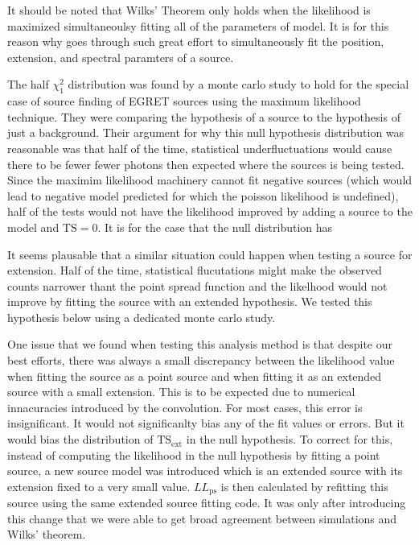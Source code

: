 \documentclass[preprint]{aastex}
\newcommand{\tsext}{{\ensuremath{\text{TS}_\text{ext}}}\xspace}
\newcommand{\ts}{\text{TS}\xspace}
\newcommand{\pointlike}{\text{\em pointlike}\xspace}
\begin{document}
It should be noted that Wilks' Theorem only holds when the likelihood
is maximized simultaneoulsy fitting all of the parameters of model. It
is for this reason why \pointlike goes through such great effort to
simultaneously fit the position, extension, and spectral paramters of
a source.

The half $\chi^2_1$ distribution was found by a monte carlo study
to hold for the special case of source finding of EGRET sources using the
maximum likelihood technique.  They were comparing the hypothesis of a
source to the hypothesis of just a background\cite{mattox_egret}.
Their argument for why this null hypothesis distribution was reasonable
was that half of the time, statistical underfluctuations would cause
there to be fewer fewer photons then expected where the sources is being
tested. Since the maximim likelihood machinery cannot fit negative
sources (which would lead to negative model predicted for which the
poisson likelihood is undefined), half of the tests would not have the
likelihood improved by adding a source to the model and $\ts=0$.
It is for the case that the null distribution has 

It seems plausable that a similar situation could happen when testing
a source for extension. Half of the time, statistical flucutations might
make the observed counts narrower thant the point spread function and
the likelhood would not improve by fitting the source with an extended
hypothesis. We tested this hypothesis below using a dedicated monte
carlo study.

One issue that we found when testing this analysis method is that
despite our best efforts, there was always a small discrepancy between
the likelihood value when fitting the source as a point source and when
fitting it as an extended source with a small extension.  This is to be
expected due to numerical innacuracies introduced by the convolution.
For most cases, this error is insignificant. It would not significanlty
bias any of the fit values or errors. But it would bias the distribution
of $\tsext$ in the null hypothesis. To correct for this,
instead of computing the likelihood in the null hypothesis by fitting
a point source, a new source model was introduced which is an extended
source with its extension fixed to a very small value. $LL_\text{ps}$
is then calculated by refitting this source using the same extended
source fitting code. It was only after introducing this change that we
were able to get broad agreement between simulations and Wilks' theorem.
\end{document}

